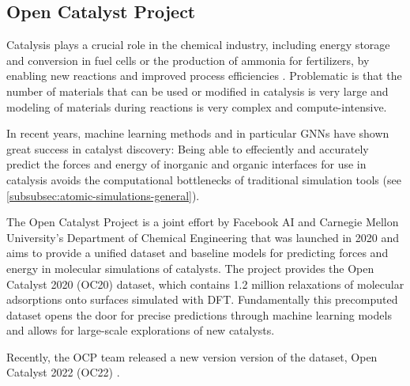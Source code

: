 \subsection{Open Catalyst Project}

Catalysis plays a crucial role in the chemical industry, including energy storage and conversion in 
fuel cells or the production of ammonia for fertilizers, by enabling new reactions and improved 
process efficiencies \cite{Chanussot_2021}. Problematic is that the number of materials that can 
be used or modified in catalysis is very large and modeling of materials during reactions is very 
complex and compute-intensive.

In recent years, machine learning methods and in particular GNNs have shown great success in 
catalyst discovery: Being able to effeciently and accurately predict the 
forces and energy of inorganic and organic interfaces for use in catalysis avoids the 
computational bottlenecks of traditional simulation tools (see \ref{subsubsec:atomic-simulations-general}). 

The Open Catalyst Project \cite*{Chanussot_2021} is a joint effort by Facebook AI and Carnegie Mellon 
University's Department of Chemical Engineering that was launched in 2020 and 
aims to provide a unified dataset and baseline models for predicting forces and energy in molecular 
simulations of catalysts. The project provides the Open Catalyst 2020 (OC20) dataset, which contains 
1.2 million relaxations of molecular adsorptions onto surfaces simulated with DFT. Fundamentally this 
precomputed dataset opens the door for precise predictions through machine learning models and allows
for large-scale explorations of new catalysts.

Recently, the OCP team released a new version version of the dataset, Open Catalyst 2022 (OC22) 
\cite{https://doi.org/10.48550/arxiv.2206.08917}.